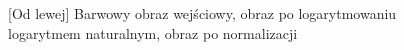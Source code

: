 \documentclass[a4paper,12pt, titlepage]{report}
\begin{document}
\FloatBarrier
\begin{figure}[h]
    \centering
    \caption{[Od lewej] Barwowy obraz wejściowy, obraz po logarytmowaniu logarytmem naturalnym, obraz po normalizacji}%
    \label{fig:geo_after_grey1}%
\end{figure}
\FloatBarrier
\end{document}
